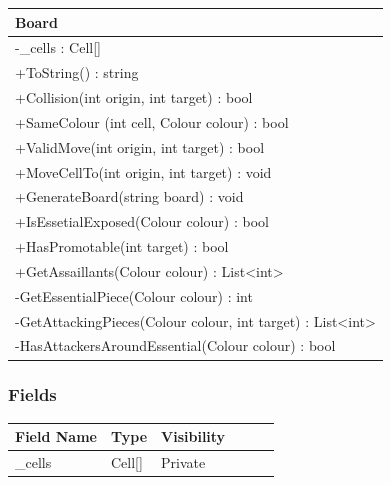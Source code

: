 \documentclass[12pt]{article}
\begin{document}
\begin{table}[H]
    \begin{tabular}{|l|}
    \hline
    \rowcolor[HTML]{C0C0C0} 
    \textbf{Board}                                             \\ \hline
    \rowcolor[HTML]{EFEFEF}                                    
    -\_cells : Cell[]                                          \\ \hline
    +ToString() : string                                       \\ \hline
    +Collision(int origin, int target) : bool                  \\ \hline
    +SameColour (int cell, Colour colour) : bool               \\ \hline
    +ValidMove(int origin, int target) : bool                  \\ \hline
    +MoveCellTo(int origin, int target) : void                 \\ \hline
    +GenerateBoard(string board) : void                        \\ \hline
    +IsEssetialExposed(Colour colour) : bool                   \\ \hline
    +HasPromotable(int target) : bool                          \\ \hline
    +GetAssaillants(Colour colour) : List\textless{}int\textgreater{}                 \\ \hline
    -GetEssentialPiece(Colour colour) : int                    \\ \hline
    -GetAttackingPieces(Colour colour, int target) : List\textless{}int\textgreater{} \\ \hline
    -HasAttackersAroundEssential(Colour colour) : bool          \\ \hline
    \end{tabular}
\end{table}

\subsubsection{Fields}

\begin{table}[H]
    \begin{tabular}{llllll}
    \hline
    \multicolumn{1}{|l|}{\cellcolor[HTML]{EFEFEF}\textbf{Field Name}} & \multicolumn{1}{l|}{\cellcolor[HTML]{EFEFEF}\textbf{Type}} & \multicolumn{1}{l|}{\cellcolor[HTML]{EFEFEF}\textbf{Visibility}} \\ \hline
    \multicolumn{1}{|l|}{\_cells}                                     & \multicolumn{1}{l|}{Cell[]}                                & \multicolumn{1}{l|}{Private}                                     \\ \hline
    \end{tabular}
\end{table}
\end{document}
